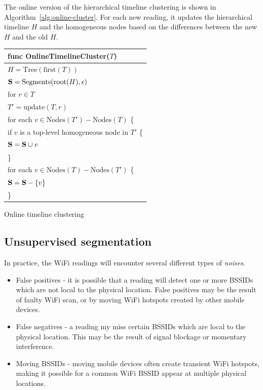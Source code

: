 The online version of the hierarchical timeline clustering is shown in
Algorithm~\ref{alg:online-cluster}.  For each new reading, it updates the
hierarchical timeline $H$ and the homogeneous nodes based on the differences
between the new $H$ and the old $H$.

\begin{algorithm}[t]
    \centering
    \begin{tabular}{|l|}\hline
        func OnlineTimelineCluster($T$) \\ \hline
        $H = \mathrm{Tree}(\mathrm{first}(T))$ \\
        $\mathbf{S} = \mathrm{Segments}(\mathrm{root}(H), \epsilon)$ \\
        for $r\in T$ \\
        \RRR $T' = \mathrm{update}(T, r)$ \\
        \RRR for each $v\in \mathrm{Nodes}(T') - \mathrm{Nodes}(T)$ \{\\
        \RRR \RRR if $v$ is a top-level homogeneous node in $T'$ \{\\
        \RRR \RRR \RRR $\mathbf{S} = \mathbf{S}\cup v$ \\
        \RRR \} \\
        \RRR for each $v\in \mathrm{Nodes}(T) - \mathrm{Nodes}(T')$ \{\\
        \RRR \RRR $\mathbf{S} = \mathbf{S} - \{v\}$ \\
        \RRR \} \\ \hline
    \end{tabular}
    \vspace{0.5cm}
    \caption{Online timeline clustering}
    \label{alg:online-cluster}
\end{algorithm}

\subsection{Unsupervised segmentation}

In practice, the WiFi readings will encounter several different types of {\em
noises}.

\begin{itemize}
    \item False positives - it is possible that a reading will detect one or
        more BSSIDs which are not local to the physical location.  False
        positives may be the result of faulty WiFi scan, or by moving WiFi
        hotspots created by other mobile devices.
    \item False negatives - a reading my miss certain BSSIDs which are local to
        the physical location.  This may be the result of signal blockage or
        momentary interference.
    \item Moving BSSIDs - moving mobile devices often create transient WiFi
        hotspots, making it possible for a common WiFi BSSID appear at multiple
        physical locations.
\end{itemize}

